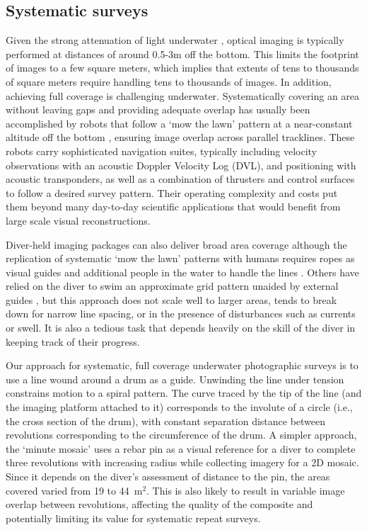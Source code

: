 \subsection{Systematic surveys}
Given the strong attenuation of light underwater \cite{Duntley_1963}, optical imaging is typically performed at distances of around 0.5-3m off the bottom. This limits the footprint of images to a few square meters, which implies that extents of tens to thousands of square meters require handling tens to thousands of images. In addition, achieving full coverage is challenging underwater. Systematically covering an area without leaving gaps and providing adequate overlap has usually been accomplished by robots that follow a `mow the lawn' pattern at a near-constant altitude off the bottom \cite{Bingham_2010}\cite{Williams_2010}, ensuring image overlap across parallel tracklines. These robots carry sophisticated navigation suites, typically including velocity observations with an acoustic Doppler Velocity Log (DVL), and positioning with acoustic transponders, as well as a combination of thrusters and control surfaces to follow a desired survey pattern. Their operating complexity and costs put them beyond many day-to-day scientific applications that would benefit from large scale visual reconstructions.

Diver-held imaging packages can also deliver broad area coverage although the replication of systematic `mow the lawn' patterns with humans requires ropes as visual guides and additional people in the water to handle the lines \cite{Henderson_2013}. Others have relied on the diver to swim an approximate grid pattern unaided by external guides \cite{Burns_2015}, but this approach does not scale well to larger areas, tends to break down for narrow line spacing, or in the presence of disturbances such as currents or swell. It is also a tedious task that depends heavily on the skill of the diver in keeping track of their progress.

Our approach for systematic, full coverage underwater photographic surveys is to use a line wound around a drum as a guide. Unwinding the line under tension constrains motion to a spiral pattern. The curve traced by the tip of the line (and the imaging platform attached to it) corresponds to the involute of a circle (i.e., the cross section of the drum), with constant separation distance between revolutions corresponding to the circumference of the drum. A simpler approach, the `minute mosaic' \cite{gintert2012third} uses a rebar pin as a visual reference for a diver to complete three revolutions with increasing radius while collecting imagery for a 2D mosaic. Since it depends on the diver's assessment of distance to the pin, the areas covered varied from 19 to 44~m$^{2}$. This is also likely to result in variable image overlap between revolutions, affecting the quality of the composite and potentially limiting its value for systematic repeat surveys.

